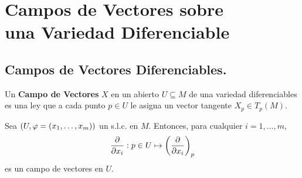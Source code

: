 \documentclass[Cursovd_portada.tex]{subfiles}
\begin{document}
\chapter{Campos de Vectores sobre\\ una Variedad Diferenciable}
\section{Campos de Vectores Diferenciables.}
\begin{defi}
Un {\bf Campo de Vectores} $X$ en un abierto $U\subseteq M$ de una variedad diferenciables es una ley que a cada
punto $p\in U$ le asigna un vector tangente $X_p\in T_p(M)$.
\end{defi}

\begin{ej}
{\rm Sea $(U,\varphi=(x_1,\dots ,x_m))$ un s.l.c. en $M$. Entonces, para cualquier $i=1,\dots ,m$,
$$\displaystyle{\frac{\partial}{\partial x_i}}:p\in U\mapsto\left(\displaystyle{\frac{\partial}{\partial x_i}}\right)_p$$
es un campo de vectores en $U$.}
\end{ej}
\end{document}
